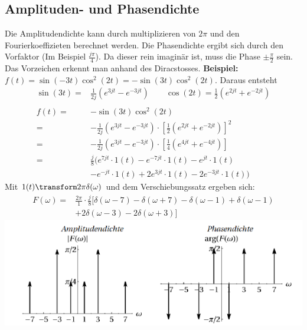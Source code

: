 \subsection{Amplituden- und Phasendichte}\label{amp_diagram}
Die Amplitudendichte kann durch multiplizieren von $2\pi$ und den Fourierkoeffizieten berechnet werden. Die Phasendichte ergibt sich durch den Vorfaktor (Im Beispiel $\frac{j\pi}{4}$). Da dieser rein imaginär ist, muss die Phase $\pm\frac{\pi}{2}$ sein. Das Vorzeichen erkennt man anhand des Diracstosses.
\textbf{Beispiel:} $f(t) = \sin(-3t)\cos^2(2t) = -\sin(3t)\cos^2(2t)$. Daraus entsteht
\begin{align*}
	\sin(3t) =& \frac{1}{2j}\left(e^{3jt} - e^{-3jt}\right) \qquad \cos(2t) = \frac{1}{2}\left(e^{2jt} + e^{-2jt}\right) \\ \\
	f(t) =& -\sin(3t)\cos^2(2t) \\
	=&-\frac{1}{2j}\left(e^{3jt} - e^{-3jt}\right)\cdot \left[\frac{1}{2}\left(e^{2jt} + e^{-2jt}\right)\right]^2\\
	=&-\frac{1}{2j}\left(e^{3jt} - e^{-3jt}\right)\cdot \left[\frac{1}{4}\left(e^{4jt} + e^{-4jt}\right)\right]\\
	=& \frac{j}{8}(e^{7jt}\cdot1(t)-e^{-7jt}\cdot1(t)-e^{jt}\cdot1(t)\\
	&-e^{-jt}\cdot1(t)+2e^{3jt}\cdot1(t)-2e^{-3jt}\cdot1(t))
\end{align*}
Mit $1(t) \transform 2\pi\delta(\omega)$ und dem Verschiebungssatz ergeben sich:
\begin{align*}
	F(\omega) =& \frac{2\pi}{1}\cdot\frac{j}{8}[\delta(\omega - 7)-\delta(\omega + 7) - \delta(\omega - 1)+\delta(\omega - 1)\\
	&+2\delta(\omega - 3) -2\delta(\omega +3)]
\end{align*}
\includegraphics[width=\columnwidth]{Images/screenshot001}
